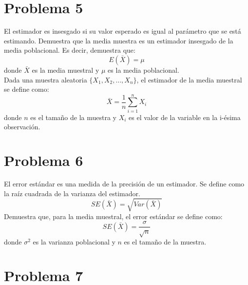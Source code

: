 \documentclass[]{article}
\begin{document}
\section*{Problema 5}

El estimador es insesgado si su valor esperado es igual al parámetro que se está estimando. Demuestra que la media muestra es un estimador insesgado de la media poblacional. Es decir, demuestra que: 
$$E(\bar{X})=\mu$$
donde $\bar{X}$ es la media muestral y $\mu$ es la media poblacional.
\\
Dada una muestra aleatoria $\{X_1, X_2, \ldots, X_n\}$, el estimador de la media muestral se define como: 
$$
\bar{X}	=	\frac{1}{n}	\sum_{i=1}^{n}	X_i
$$
donde $n$ es el tamaño de la muestra y $X_i$ es el valor de la variable en la i-ésima observación.

\section*{Problema 6}

El error estándar es una medida de la precisión de un estimador. Se define como la raíz cuadrada de la varianza del estimador. 
$$
SE(\bar{X})=\sqrt{Var(\bar{X})}
$$
Demuestra que, para la media muestral, el error estándar se define como: 
$$
SE(\bar{X})=\frac{\sigma}{\sqrt{n}}
$$
donde $\sigma^2$ es la varianza poblacional y $n$ es el tamaño de la muestra.

\section*{Problema 7}
\end{document}

